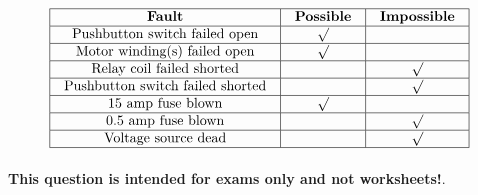 \eject







$$\vbox{\offinterlineskip
\halign{\strut
\vrule \quad\hfil # \ \hfil & 
\vrule \quad\hfil # \ \hfil & 
\vrule \quad\hfil # \ \hfil \vrule \cr
\noalign{\hrule}
%
{\bf Fault} & {\bf Possible} & {\bf Impossible} \cr
%
\noalign{\hrule}
%
Pushbutton switch failed open & $\surd$ &  \cr
%
\noalign{\hrule}
%
Motor winding(s) failed open & $\surd$ &  \cr
%
\noalign{\hrule}
%
Relay coil failed shorted &  & $\surd$ \cr
%
\noalign{\hrule}
%
Pushbutton switch failed shorted &  & $\surd$ \cr
%
\noalign{\hrule}
%
15 amp fuse blown & $\surd$ &  \cr
%
\noalign{\hrule}
%
0.5 amp fuse blown &  & $\surd$ \cr
%
\noalign{\hrule}
%
Voltage source dead &  & $\surd$ \cr
%
\noalign{\hrule}
} %
}$$ %







{\bf This question is intended for exams only and not worksheets!}.



